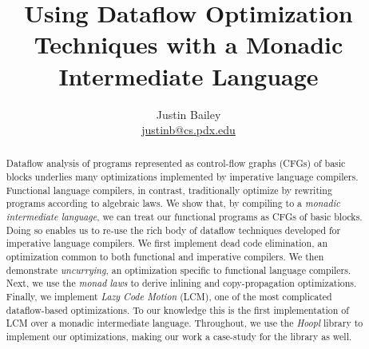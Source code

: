\documentclass[12pt]{article}
\begin{document}
           {\doublespacing}{}

\newcommand{\authorEmail}{\url{justinb@cs.pdx.edu}}
%
           {\newcommand{\authorEmail}{\url{justinb@@cs.pdx.edu}}}%
           {}

\date{}
\author{Justin Bailey \\ \authorEmail}
\title{Using Dataflow Optimization Techniques with a Monadic Intermediate Language}

\maketitle 
\ifthenelse{\standaloneFlag}
           {\thispagestyle{empty}}
           {}

\renewcommand{\abstractnamefont}{\normalfont\small\sffamily\bfseries}
\begin{abstract}
  Dataflow analysis of programs represented as control-flow graphs
  (CFGs) of basic blocks underlies many optimizations implemented by
  imperative language compilers. Functional language compilers, in
  contrast, traditionally optimize by rewriting programs according to
  algebraic laws. We show that, by compiling to a \emph{monadic
    intermediate language}, we can treat our functional programs as
  CFGs of basic blocks. Doing so enables us to re-use the rich body of
  dataflow techniques developed for imperative language compilers. We
  first implement dead code elimination, an optimization common to
  both functional and imperative compilers. We then demonstrate
  \emph{uncurrying}, an optimization specific to functional language
  compilers. Next, we use the \emph{monad laws} to derive inlining and
  copy-propagation optimizations. Finally, we implement \emph{Lazy
    Code Motion} (LCM), one of the most complicated dataflow-based
  optimizations. To our knowledge this is the first implementation of
  LCM over a monadic intermediate language. Throughout, we use the
  \emph{Hoopl} library to implement our optimizations, making our work
  a case-study for the library as well.
\end{abstract}
\end{document}
